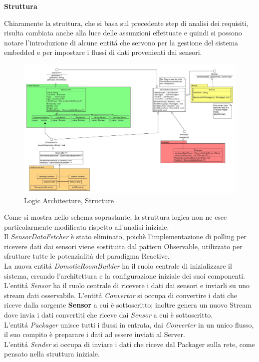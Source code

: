 \afterpage{\clearpage}

\newpage

\begin{center}
  \textbf{Struttura}
\end{center}

Chiaramente la struttura, che si basa sul precedente step di analisi dei requisiti, risulta cambiata anche alla luce delle assunzioni effettuate e quindi si possono notare l'introduzione di alcune entit\'a che servono per la gestione del sistema embedded e per impostare i flussi di dati provenienti dai sensori.

\begin{figure}[h]
\centering
\includegraphics[scale=0.2]{Figures/LogicArchitecture/EmbeddedSystem/Structure}
\caption{Logic Architecture, Structure}
\end{figure}

Come si mostra nello schema soprastante, la struttura logica non ne esce particolarmente modificata rispetto all'analisi iniziale.\\
Il \textit{SensorDataFetcher} è stato eliminato, poich\`e l'implementazione di polling per ricevere dati dai sensori viene sostituita dal pattern Observable, utilizzato per sfruttare tutte le potenzialità del paradigma Reactive. \\
La nuova entit\'a \textit{DomoticRoomBuilder} ha il ruolo centrale di inizializzare il sistema, creando l'architettura e la configurazione iniziale dei suoi componenti.\\
L'entit\'a \textit{Sensor} ha il ruolo centrale di ricevere i dati dai sensori e inviarli su uno stream dati osservabile.
L'entit\'a \textit{Convertor} si occupa di convertire i dati che riceve dalla sorgente \textbf{Sensor} a cui è sottoscritto; inoltre genera un nuovo Stream dove invia i dati convertiti che riceve dai \textit{Sensor} a cui è sottoscritto.\\
L'entit\'a \textit{Packager} unisce tutti i flussi in entrata, dai \textit{Converter} in un unico flusso, il suo compito è preparare i dati ad essere inviati al Server.\\
L'entit\'a \textit{Sender} si occupa di inviare i dati che riceve dal Packager sulla rete, come pensato nella struttura iniziale.

